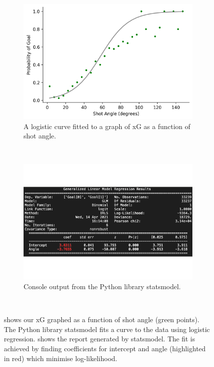 \documentclass{l4proj}
\begin{document}
\begin{figure}[htb] 
    \centering
    \begin{subfigure}[b]{0.45\textwidth}
        \includegraphics[width=\textwidth]{images/anglefit.png}
        \caption{A logistic curve fitted to a graph of xG as a function of shot angle.}
        \label{fig:angfit}
    \end{subfigure}
    ~
    \begin{subfigure}[b]{0.45\textwidth}
        \includegraphics[width=\textwidth]{images/statsmodeloutput.png}
        \caption{Console output from the Python library statsmodel.}
        \label{fig:smout1}
    \end{subfigure}
    ~   
    \caption{ shows our xG graphed as a function of shot angle (green points). The Python library statsmodel fits a curve to the data using logistic regression.  shows the report generated by statsmodel. The fit is achieved by finding coefficients for intercept and angle (highlighted in red) which minimise log-likelihood.}
    \label{fig:fitt1}
\end{figure}
\end{document}
